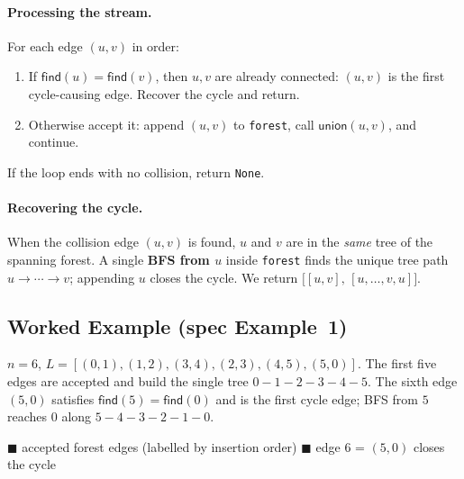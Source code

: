 \documentclass[11pt]{article}
\begin{document}
\paragraph{Processing the stream.} For each edge $(u,v)$ in order:
\begin{enumerate}[leftmargin=1.6em, itemsep=2pt]
  \item If $\textsf{find}(u)=\textsf{find}(v)$, then $u,v$ are already connected:
  $(u,v)$ is the first cycle-causing edge. Recover the cycle and return.
  \item Otherwise accept it: append $(u,v)$ to \texttt{forest}, call
  $\textsf{union}(u,v)$, and continue.
\end{enumerate}
If the loop ends with no collision, return \texttt{None}.

\paragraph{Recovering the cycle.} When the collision edge $(u,v)$ is found, $u$
and $v$ are in the \emph{same} tree of the spanning forest. A single
\textbf{BFS from $u$} inside \texttt{forest} finds the unique tree path
$u\rightarrow\cdots\rightarrow v$; appending $u$ closes the cycle. We return
$\big[[u,v],\,[u,\dots,v,u]\big]$.

\subsection{Worked Example (spec Example~1)}
$n=6$, $L=[(0,1),(1,2),(3,4),(2,3),(4,5),(5,0)]$. The first five edges are
accepted and build the single tree $0\!-\!1\!-\!2\!-\!3\!-\!4\!-\!5$. The sixth
edge $(5,0)$ satisfies $\textsf{find}(5)=\textsf{find}(0)$ and is the first cycle
edge; BFS from $5$ reaches $0$ along $5\!-\!4\!-\!3\!-\!2\!-\!1\!-\!0$.

\begin{center}
\end{center}
\vspace{-0.4em}
\begin{center}\footnotesize
\textcolor{keep}{$\blacksquare$ accepted forest edges (labelled by insertion
order)} \qquad
\textcolor{cycle}{$\blacksquare$ edge 6 = $(5,0)$ closes the cycle}
\end{center}
\end{document}
